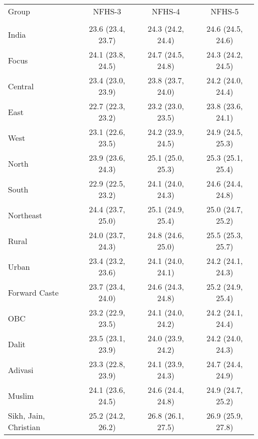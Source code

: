 \begin{tabular}{lccc}
\toprule
Group & NFHS-3 & NFHS-4 & NFHS-5 \\\\
\midrule
India&23.6 (23.4, 23.7)&24.3 (24.2, 24.4)&24.6 (24.5, 24.6)\\
Focus&24.1 (23.8, 24.5)&24.7 (24.5, 24.8)&24.3 (24.2, 24.5)\\
Central&23.4 (23.0, 23.9)&23.8 (23.7, 24.0)&24.2 (24.0, 24.4)\\
East&22.7 (22.3, 23.2)&23.2 (23.0, 23.5)&23.8 (23.6, 24.1)\\
West&23.1 (22.6, 23.5)&24.2 (23.9, 24.5)&24.9 (24.5, 25.3)\\
North&23.9 (23.6, 24.3)&25.1 (25.0, 25.3)&25.3 (25.1, 25.4)\\
South&22.9 (22.5, 23.2)&24.1 (24.0, 24.3)&24.6 (24.4, 24.8)\\
Northeast&24.4 (23.7, 25.0)&25.1 (24.9, 25.4)&25.0 (24.7, 25.2)\\
Rural&24.0 (23.7, 24.3)&24.8 (24.6, 25.0)&25.5 (25.3, 25.7)\\
Urban&23.4 (23.2, 23.6)&24.1 (24.0, 24.1)&24.2 (24.1, 24.3)\\
Forward Caste&23.7 (23.4, 24.0)&24.6 (24.3, 24.8)&25.2 (24.9, 25.4)\\
OBC&23.2 (22.9, 23.5)&24.1 (24.0, 24.2)&24.2 (24.1, 24.4)\\
Dalit&23.5 (23.1, 23.9)&24.0 (23.9, 24.2)&24.2 (24.0, 24.3)\\
Adivasi&23.3 (22.8, 23.9)&24.1 (23.9, 24.3)&24.7 (24.4, 24.9)\\
Muslim&24.1 (23.6, 24.5)&24.6 (24.4, 24.8)&24.9 (24.7, 25.2)\\
Sikh, Jain, Christian&25.2 (24.2, 26.2)&26.8 (26.1, 27.5)&26.9 (25.9, 27.8)\\
\bottomrule
\end{tabular}
